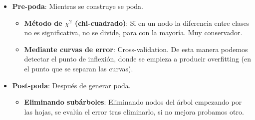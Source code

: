 \documentclass[12pt]{report} %
\begin{document}
\begin{itemize}
\item
  \textbf{Pre-poda}: Mientras se construye se poda.

  \begin{itemize}
  
  \item
    \textbf{Método de \(\chi^2\) (chi-cuadrado)}: Si en un nodo la
    diferencia entre clases no es significativa, no se divide, para con
    la mayoría. Muy conservador.
  \item
    \textbf{Mediante curvas de error}: Cross-validation. De esta manera
    podemos detectar el punto de inflexión, donde se empieza a producir
    overfitting (en el punto que se separan las curvas).
  \end{itemize}
\item
  \textbf{Post-poda}: Después de generar poda.

  \begin{itemize}
  \item
    \textbf{Eliminando subárboles}: Eliminando nodos del árbol empezando
    por las hojas, se evalúa el error tras eliminarlo, si no mejora
    probamos otro.


\end{itemize}
\end{itemize}
\end{document}

